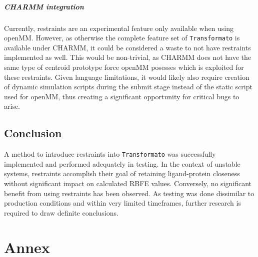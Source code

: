 \documentclass[oneside]{scrreprt}
\begin{document}
\paragraph{CHARMM integration} Currently, restraints are an experimental feature only available when using openMM. However, as otherwise the complete feature set of \texttt{Transformato} is available under CHARMM, it could be considered a waste to not have restraints implemented as well. This would be non-trivial, as CHARMM does not have the same type of centroid prototype force openMM posesses which is exploited for these restraints. Given language limitations, it would likely also require creation of dynamic simulation scripts during the submit stage instead of the static script used for openMM, thus creating a significant opportunity for critical bugs to arise.

\section{Conclusion}
A method to introduce restraints into \texttt{Transformato} was successfully implemented and performed adequately in testing. In the context of unstable systems, restraints accomplish their goal of retaining ligand-protein closeness without significant impact on calculated RBFE values. Conversely, no significant benefit from using restraints has been observed. As testing was done dissimilar to production conditions and within very limited timeframes, further research is required to draw definite conclusions.
\chapter{Annex}
\end{document}
